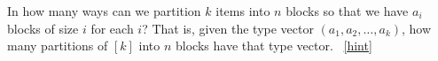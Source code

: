 \documentclass{book}
\begin{document}
\setcounter{project}{276}
\addtocounter{project}{-1}
\begin{activity}[]\label{partitionsgivenpartsize}
\hypertarget{p-1454}{}%
In how many ways can we partition \(k\) items into \(n\) blocks so that we have \(a_i\) blocks of size \(i\) for each \(i\)? That is, given the type vector \((a_1, a_2, \ldots, a_k)\), how many partitions of \([k]\) into \(n\) blocks have that type vector.%
~\hfill{\tiny\hyperlink{a-276}{[hint]}\hypertarget{q-276}{}}\end{activity}
\end{document}

